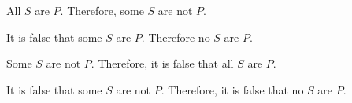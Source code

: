 \begin{exercises}
\item  All $S$ are $P$. Therefore, some $S$ are not $P$.



\item It is false that some $S$ are $P$. Therefore no $S$ are $P$.





\item Some $S$ are not $P$. Therefore, it is false that all $S$ are $P$.

\item It is false that some $S$ are not $P$. Therefore, it is false that no $S$ are $P$.


\end{exercises}
